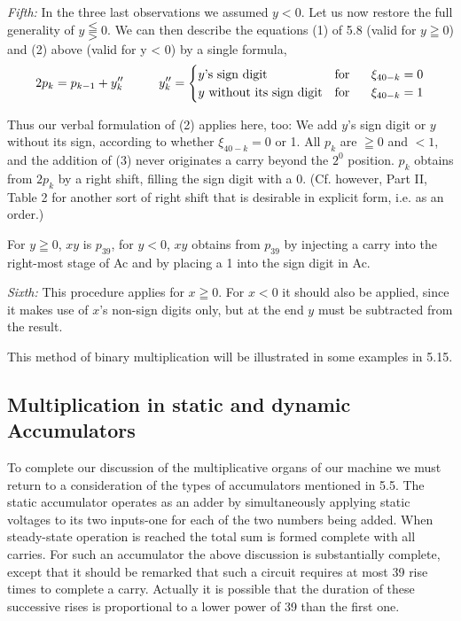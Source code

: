\documentclass[12pt]{amsart}
\begin{document}
\emph{Fifth:} In the three last observations we assumed $y < 0$. Let us now restore the full generality of $y \lesseqqgtr 0$. We can then describe the equations (1) of 5.8 (valid for $y \geqq 0$) and (2) above (valid for y < 0) by a single formula,
\begin{equation}
2p_k = p_{k-1} + y''_k \hspace{10 mm} y''_k =
\begin{cases}
y\text{'s sign digit}& \text{for } \hspace{5 mm} \xi_{40 - k} = 0\\
y\text{ without its sign digit}& \text{for } \hspace{5 mm} \xi_{40 - k} = 1
\end{cases}
\end{equation}

Thus our verbal formulation of (2) applies here, too: We add $y$'s sign digit or $y$ without its sign, according to whether $\xi_{40 - k} = 0$ or 1. All $p_k$ are $\geqq 0$ and $< 1$, and the addition of (3) never originates a carry beyond the $2^0$ position. $p_k$ obtains from $2p_k$ by a right shift, filling the sign digit with a 0. (Cf. however, Part II, Table 2 for another sort of right shift that is desirable in explicit form, i.e. as an order.)

For $y \geqq 0$, $xy$ is $p_{39}$, for $y < 0$, $xy$ obtains from $p_{39}$ by injecting a carry into the right-most stage of Ac and by placing a 1 into the sign digit in Ac.

\emph{Sixth:} This procedure applies for $x \geqq 0$. For $x < 0$ it should also be applied, since it makes use of $x$'s non-sign digits only, but at the end $y$ must be subtracted from the result.

This method of binary multiplication will be illustrated in some examples in 5.15.

\subsection{Multiplication in static and dynamic Accumulators}
To complete our discussion of the multiplicative organs of our machine we must return to a consideration of the types of accumulators mentioned in 5.5. The static accumulator operates as an adder by simultaneously applying static voltages to its two inputs-one for each of the two numbers being added. When steady-state operation is reached the total sum is formed complete with all carries. For such an accumulator the above discussion is substantially complete, except that it should be remarked that such a circuit requires at most 39 rise times to complete a carry. Actually it is possible that the duration of these successive rises is proportional to a lower power of 39 than the first one.
\end{document}
